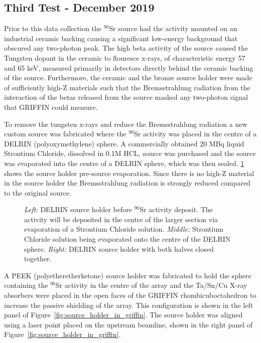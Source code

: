 \documentclass[cnatzke_thesis_proposal.tex]{subfiles}
\begin{document}
\subsection{Third Test - December 2019}

Prior to this data collection the $^{90}$Sr source had the activity mounted on an industrial ceramic backing causing a significant low-energy background that obscured any two-photon peak.
The high beta activity of the source caused the Tungsten dopant in the ceramic to flouresce x-rays, of characteristic energy 57 and 65 keV, measured primarily in detectors directly behind the ceramic backing of the source.
Furthermore, the ceramic and the bronze source holder were made of sufficiently high-Z materials such that the Bremsstrahlung radiation from the interaction of the betas released from the source masked any two-photon signal that GRIFFIN could measure.

To remove the tungsten x-rays and reduce the Bremsstrahlung radiation a new custom source was fabricated where the $^{90}$Sr activity was placed in the centre of a DELRIN (polyoxymethylene) sphere.
A commercially obtained 20 MBq liquid Strontium Chloride, dissolved in 0.1M HCL, source was purchased and the source was evaporated into the centre of a DELRIN sphere, which was then sealed.
\ref{fig:source_holder} shows the source holder pre-source evaporation.
Since there is no high-Z material in the source holder the Bremsstrahlung radiation is strongly reduced compared to the original source.


\begin{figure}[htbp]
  \centering
  \quad
  \quad
  \caption{
    \textit{Left:} DELRIN source holder before $^{90}$Sr activity deposit. The activity will be deposited in the centre of the larger section via evaporation of a Strontium Chloride solution.
    \textit{Middle:} Strontium Chloride solution being evaporated onto the centre of the DELRIN sphere.
    \textit{Right:} DELRIN source holder with both halves closed together.
  }
  \label{fig:source_holder}
\end{figure}

A PEEK (polyetheretherketone) source holder was fabricated to hold the sphere containing the $^{90}$Sr activity in the centre of the array and the Ta/Sn/Cu X-ray absorbers were placed in the open faces of the GRIFFIN rhombicuboctahedron to increase the passive shielding of the array. This configuration is shown in the left panel of Figure~\ref{fig:source_holder_in_griffin}. The source holder was aligned using a laser point placed on the upstream beamline, shown in the right panel of Figure~\ref{fig:source_holder_in_griffin}.
\end{document}
